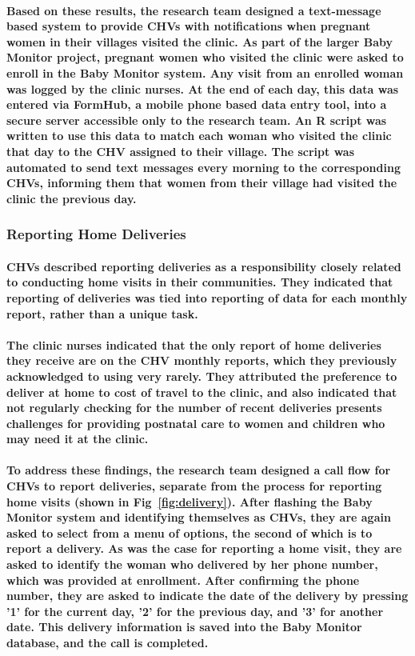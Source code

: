 \paragraph{Based on these results, the research team designed a text-message based system to provide CHVs with notifications when pregnant women in their villages visited the clinic.  As part of the larger Baby Monitor project, pregnant women who visited the clinic were asked to enroll in the Baby Monitor system. Any visit from an enrolled woman was logged by the clinic nurses. At the end of each day, this data was entered via FormHub, a mobile phone based data entry tool, into a secure server accessible only to the research team. An R script was written to use this data to match each woman who visited the clinic that day to the CHV assigned to their village. The script was automated to send text messages every morning to the corresponding CHVs, informing them that women from their village had visited the clinic the previous day.}

\subsubsection{Reporting Home Deliveries}
\paragraph{CHVs described reporting deliveries as a responsibility closely related to conducting home visits in their communities. They indicated that reporting of deliveries was tied into reporting of data for each monthly report, rather than a unique task.}

\paragraph{The clinic nurses indicated that the only report of home deliveries they receive are on the CHV monthly reports, which they previously acknowledged to using very rarely. They attributed the preference to deliver at home to cost of travel to the clinic, and also indicated that not regularly checking for the number of recent deliveries presents challenges for providing postnatal care to women and children who may need it at the clinic.}

\paragraph{To address these findings, the research team designed a call flow for CHVs to report deliveries, separate from the process for reporting home visits (shown in Fig~\ref{fig:delivery}). After flashing the Baby Monitor system and identifying themselves as CHVs, they are again asked to select from a menu of options, the second of which is to report a delivery. As was the case for reporting a home visit, they are asked to identify the woman who delivered by her phone number, which was provided at enrollment. After confirming the phone number, they are asked to indicate the date of the delivery by pressing '1' for the current day, '2' for the previous day, and '3' for another date. This delivery information is saved into the Baby Monitor database, and the call is completed.}



